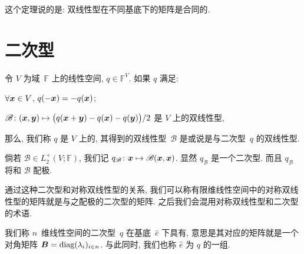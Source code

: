\documentclass[openany, a5paper, oneside]{ctexbook}
\begin{document}
这个定理说的是: 双线性型在不同基底下的矩阵是合同的.

\section{二次型}

\begin{definition}[二次型]
	令 $V$ 为域~$\mathbb F$ 上的线性空间, $q \in \mathbb F^V$. 如果 $q$ 满足:
	\begin{conditionlist}[label=\roman*)]
		\item $\forall \boldsymbol{x} \in V$, $q(- \boldsymbol{x}) = - q(\boldsymbol{x})$;
		\item $\mathscr B \colon (\boldsymbol{x}, \boldsymbol{y}) \mapsto \big(q(\boldsymbol{x} + \boldsymbol{y}) - q(\boldsymbol{x}) - q(\boldsymbol{y})\big)/2$ 是 $V$ 上的双线性型,
	\end{conditionlist}
	那么, 我们称 $q$ 是 $V$ 上的, 其得到的双线性型~$\mathscr B$ 是或说是与二次型~$q$ 的双线性型.
\end{definition}

倘若 $\mathscr B \in L^+_2(V; \mathbb F)$, 我们记 $q_\mathscr B \colon \boldsymbol{x} \mapsto \mathscr B(\boldsymbol{x}, \boldsymbol{x})$. 
显然 $q_\mathscr B$ 是一个二次型. 
而且 $q_\mathscr B$ 将和 $\mathscr B$ 配极.

通过这种二次型和对称双线性型的关系, 我们可以称有限维线性空间中的对称双线性型的矩阵就是与之配极的二次型的矩阵. 
之后我们会混用对称双线性型和二次型的术语.

\begin{definition}[规范型]
	我们称 $n$~维线性空间的二次型~$q$ 在基底~$\hat e$ 下具有, 意思是其对应的矩阵就是一个对角矩阵 $\boldsymbol{B} = \operatorname{diag}(\lambda_i)_{i \in n}$.
	与此同时, 我们也称 $\hat e$ 为 $q$ 的一组.
\end{definition}
\end{document}
